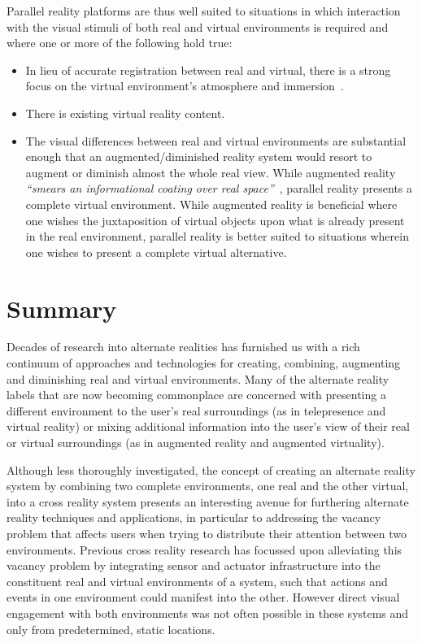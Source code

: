 Parallel reality platforms are thus well suited to situations in which interaction with the visual stimuli of both real and virtual environments is required and where one or more of the following hold true:

\begin{itemize}
	\item In lieu of accurate registration between real and virtual, there is a strong focus on the virtual environment's atmosphere and immersion~\cite{deamicis:gamebased}.
	\item There is existing virtual reality content.
	\item The visual differences between real and virtual environments are substantial enough that an augmented/diminished reality system would resort to augment or diminish almost the whole real view. While augmented reality \textit{``smears an informational coating over real space''}~\cite{Andersen}, parallel reality presents a complete virtual environment. While augmented reality is beneficial where one wishes the juxtaposition of virtual objects upon what is already present in the real environment, parallel reality is better suited to situations wherein one wishes to present a complete virtual alternative.
\end{itemize}


\section{Summary}
Decades of research into alternate realities has furnished us with a rich continuum of approaches and technologies for creating, combining, augmenting and diminishing real and virtual environments. Many of the alternate reality labels that are now becoming commonplace are concerned with presenting a different environment to the user's real surroundings (as in telepresence and virtual reality) or mixing additional information into the user's view of their real or virtual surroundings (as in augmented reality and augmented virtuality).

Although less thoroughly investigated, the concept of creating an alternate reality system by combining two complete environments, one real and the other virtual, into a cross reality system presents an interesting avenue for furthering alternate reality techniques and applications, in particular to addressing the vacancy problem that affects users when trying to distribute their attention between two environments. Previous cross reality research has focussed upon alleviating this vacancy problem by integrating sensor and actuator infrastructure into the constituent real and virtual environments of a system, such that actions and events in one environment could manifest into the other. However direct visual engagement with both environments was not often possible in these systems and only from predetermined, static locations.

